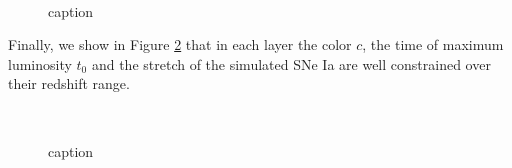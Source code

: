 \documentclass[\docopts]{\docclass}
\begin{document}
\begin{figure}[t]
\begin{center}
\\
\caption{caption}
\label{fig:lc_examples}
\end{center}
\end{figure}

Finally, we show in Figure \ref{fig:sigmas} that in each layer the color $c$, the time of maximum luminosity $t_0$ and the stretch of the simulated SNe Ia are well constrained over their redshift range.

\begin{figure}[t]
\begin{center}
\\
\caption{caption}
\label{fig:sigmas}
\end{center}
\end{figure}
\end{document}
